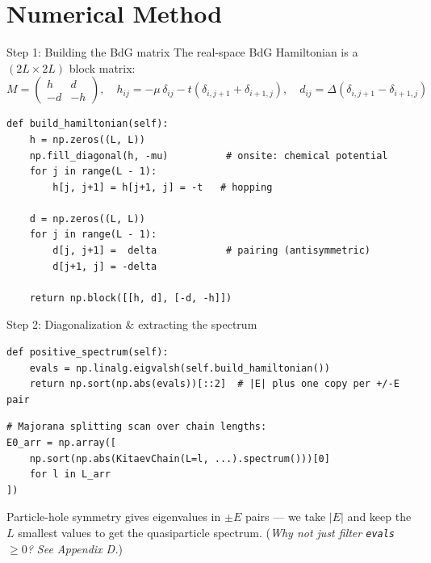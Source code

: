\documentclass[aspectratio=169, 12pt]{beamer}
\begin{document}
\section{Numerical Method}

\begin{frame}[fragile]{Step 1: Building the BdG matrix}
  The real-space BdG Hamiltonian is a $(2L \times 2L)$ block matrix:
  \[
    M = \begin{pmatrix} h & d \\ -d & -h \end{pmatrix}, \quad
    h_{ij} = -\mu\,\delta_{ij} - t(\delta_{i,j+1}+\delta_{i+1,j}), \quad
    d_{ij} = \Delta(\delta_{i,j+1} - \delta_{i+1,j})
  \]

  \begin{lstlisting}
def build_hamiltonian(self):
    h = np.zeros((L, L))
    np.fill_diagonal(h, -mu)          # onsite: chemical potential
    for j in range(L - 1):
        h[j, j+1] = h[j+1, j] = -t   # hopping

    d = np.zeros((L, L))
    for j in range(L - 1):
        d[j, j+1] =  delta            # pairing (antisymmetric)
        d[j+1, j] = -delta

    return np.block([[h, d], [-d, -h]])
  \end{lstlisting}
\end{frame}

\begin{frame}[fragile]{Step 2: Diagonalization \& extracting the spectrum}
  \begin{lstlisting}
def positive_spectrum(self):
    evals = np.linalg.eigvalsh(self.build_hamiltonian())
    return np.sort(np.abs(evals))[::2]  # |E| plus one copy per +/-E pair
  \end{lstlisting}

  \medskip
  \begin{lstlisting}
# Majorana splitting scan over chain lengths:
E0_arr = np.array([
    np.sort(np.abs(KitaevChain(L=l, ...).spectrum()))[0]
    for l in L_arr
])
  \end{lstlisting}

  \medskip
  Particle-hole symmetry gives eigenvalues in $\pm E$ pairs — we take $|E|$
  and keep the $L$ smallest values to get the quasiparticle spectrum.
  (\textit{Why not just filter \texttt{evals} $\geq 0$? See Appendix D.})
\end{frame}

\end{document}
